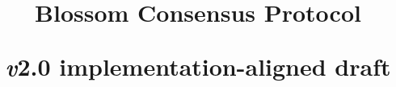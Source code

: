 \documentclass{apa7}
\title{Blossom Consensus Protocol

\small\textit{v}2.0 implementation-aligned draft}
\begin{document}
\maketitle

\twocolumn
\tableofcontents












\onecolumn


\end{document}
